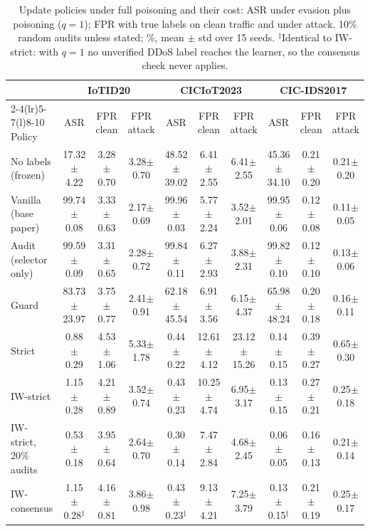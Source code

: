 \documentclass[conference]{IEEEtran}
\begin{document}
\begin{table}[t]
\caption{Update policies under full poisoning and their cost: ASR under evasion plus poisoning ($q=1$); FPR with true labels on clean traffic and under attack. 10\% random audits unless stated; \%, mean $\pm$ std over 15 seeds. $^{\ddagger}$Identical to IW-strict: with $q=1$ no unverified DDoS label reaches the learner, so the consensus check never applies.}
\label{tab:loop}
\centering
\footnotesize
\setlength{\tabcolsep}{3pt}
\begin{tabular}{@{}lccccccccc@{}}
\toprule
 & \multicolumn{3}{c}{IoTID20} & \multicolumn{3}{c}{CICIoT2023} & \multicolumn{3}{c}{CIC-IDS2017} \\
\cmidrule(lr){2-4}\cmidrule(lr){5-7}\cmidrule(l){8-10}
Policy & ASR & FPR clean & FPR attack & ASR & FPR clean & FPR attack & ASR & FPR clean & FPR attack \\
\midrule
No labels (frozen) & 17.32$\pm$4.22 & 3.28$\pm$0.70 & 3.28$\pm$0.70 & 48.52$\pm$39.02 & 6.41$\pm$2.55 & 6.41$\pm$2.55 & 45.36$\pm$34.10 & 0.21$\pm$0.20 & 0.21$\pm$0.20 \\
Vanilla (base paper) & 99.74$\pm$0.08 & 3.33$\pm$0.63 & 2.17$\pm$0.69 & 99.96$\pm$0.03 & 5.77$\pm$2.24 & 3.52$\pm$2.01 & 99.95$\pm$0.06 & 0.12$\pm$0.08 & 0.11$\pm$0.05 \\
Audit (selector only) & 99.59$\pm$0.09 & 3.31$\pm$0.65 & 2.28$\pm$0.72 & 99.84$\pm$0.11 & 6.27$\pm$2.93 & 3.88$\pm$2.31 & 99.82$\pm$0.10 & 0.12$\pm$0.10 & 0.13$\pm$0.06 \\
Guard & 83.73$\pm$23.97 & 3.75$\pm$0.77 & 2.41$\pm$0.91 & 62.18$\pm$45.54 & 6.91$\pm$3.56 & 6.15$\pm$4.37 & 65.98$\pm$48.24 & 0.20$\pm$0.18 & 0.16$\pm$0.11 \\
Strict & 0.88$\pm$0.29 & 4.53$\pm$1.06 & 5.33$\pm$1.78 & 0.44$\pm$0.22 & 12.61$\pm$4.12 & 23.12$\pm$15.26 & 0.14$\pm$0.15 & 0.39$\pm$0.27 & 0.65$\pm$0.30 \\
IW-strict & 1.15$\pm$0.28 & 4.21$\pm$0.89 & 3.52$\pm$0.74 & 0.43$\pm$0.23 & 10.25$\pm$4.74 & 6.95$\pm$3.17 & 0.13$\pm$0.15 & 0.27$\pm$0.21 & 0.25$\pm$0.18 \\
IW-strict, 20\% audits & 0.53$\pm$0.18 & 3.95$\pm$0.64 & 2.64$\pm$0.70 & 0.30$\pm$0.14 & 7.47$\pm$2.84 & 4.68$\pm$2.45 & 0.06$\pm$0.05 & 0.16$\pm$0.13 & 0.21$\pm$0.14 \\
IW-consensus & 1.15$\pm$0.28$^\ddagger$ & 4.16$\pm$0.81 & 3.86$\pm$0.98 & 0.43$\pm$0.23$^\ddagger$ & 9.13$\pm$4.21 & 7.25$\pm$3.79 & 0.13$\pm$0.15$^\ddagger$ & 0.21$\pm$0.19 & 0.25$\pm$0.17 \\
\bottomrule
\end{tabular}
\end{table}
\end{document}
